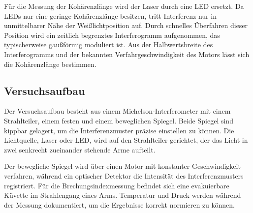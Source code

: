 Für die Messung der Kohärenzlänge wird der Laser durch eine LED ersetzt. Da LEDs nur eine geringe Kohärenzlänge besitzen, tritt Interferenz nur in unmittelbarer Nähe der Weißlichtposition auf. Durch schnelles Überfahren dieser Position wird ein zeitlich begrenztes Interferogramm aufgenommen, das typischerweise gaußförmig moduliert ist. Aus der Halbwertsbreite des Interferogramms und der bekannten Verfahrgeschwindigkeit des Motors lässt sich die Kohärenzlänge bestimmen.

\subsection{Versuchsaufbau}
Der Versuchsaufbau besteht aus einem Michelson-Interferometer mit einem Strahlteiler, einem festen und einem beweglichen Spiegel. Beide Spiegel sind kippbar gelagert, um die Interferenzmuster präzise einstellen zu können. Die Lichtquelle, Laser oder LED, wird auf den Strahlteiler gerichtet, der das Licht in zwei senkrecht zueinander stehende Arme aufteilt.  

Der bewegliche Spiegel wird über einen Motor mit konstanter Geschwindigkeit verfahren, während ein optischer Detektor die Intensität des Interferenzmusters registriert. Für die Brechungsindexmessung befindet sich eine evakuierbare Küvette im Strahlengang eines Arms. Temperatur und Druck werden während der Messung dokumentiert, um die Ergebnisse korrekt normieren zu können.
